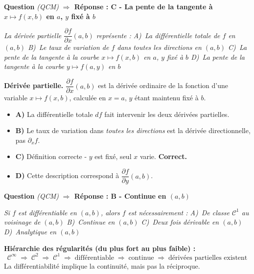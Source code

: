 \documentclass[11pt,a4paper]{article}
\newcounter{qnum}
\newcommand{\qtitre}[2]{%
  \stepcounter{qnum}%
  \medskip\noindent
  \textbf{\color{bleutexte}Question \theqnum}\enspace
  \textit{(#1)}\enspace
  \textcolor{vertok}{\textbf{$\Rightarrow$ Réponse : #2}}
  \par\smallskip
}
\newcommand{\qenonce}[1]{%
  \begin{mdframed}[backgroundcolor=grisbox, linewidth=0pt,
    innerleftmargin=8pt, innerrightmargin=8pt,
    innertopmargin=5pt, innerbottommargin=5pt,
    skipabove=2pt, skipbelow=4pt]
  \small\textit{#1}
  \end{mdframed}
}
\begin{document}
\qtitre{QCM}{C - La pente de la tangente à $x\mapsto f(x,b)$ en $a$, $y$ fixé à $b$}
\qenonce{La dérivée partielle $\dfrac{\partial f}{\partial x}(a,b)$ représente :
\quad A)~La différentielle totale de $f$ en $(a,b)$
\quad B)~Le taux de variation de $f$ dans toutes les directions en $(a,b)$
\quad C)~La pente de la tangente à la courbe $x\mapsto f(x,b)$ en $a$, $y$ fixé à $b$
\quad D)~La pente de la tangente à la courbe $y\mapsto f(a,y)$ en $b$}

\begin{methodebox}
\textbf{Dérivée partielle.} $\dfrac{\partial f}{\partial x}(a,b)$ est la dérivée ordinaire de la fonction d'une variable $x\mapsto f(x,b)$, calculée en $x=a$, $y$ étant maintenu fixé à $b$.
\end{methodebox}

\begin{itemize}[leftmargin=1.5em, itemsep=2pt]
  \item \textcolor{rougeerr}{\textbf{A)}} La différentielle totale $df$ fait intervenir les deux dérivées partielles.
  \item \textcolor{rougeerr}{\textbf{B)}} Le taux de variation dans \emph{toutes les directions} est la dérivée directionnelle, pas $\partial_x f$.
  \item \textcolor{vertok}{\textbf{C)}} Définition correcte - $y$ est fixé, seul $x$ varie. \textbf{Correct.}
  \item \textcolor{rougeerr}{\textbf{D)}} Cette description correspond à $\dfrac{\partial f}{\partial y}(a,b)$.
\end{itemize}

\qtitre{QCM}{B - Continue en $(a,b)$}
\qenonce{Si $f$ est différentiable en $(a,b)$, alors $f$ est nécessairement :
\quad A)~De classe $\mathcal{C}^1$ au voisinage de $(a,b)$
\quad B)~Continue en $(a,b)$
\quad C)~Deux fois dérivable en $(a,b)$
\quad D)~Analytique en $(a,b)$}

\begin{methodebox}
\textbf{Hiérarchie des régularités (du plus fort au plus faible) :}
$$\mathcal{C}^\infty \;\Rightarrow\; \mathcal{C}^2 \;\Rightarrow\; \mathcal{C}^1 \;\Rightarrow\; \text{différentiable} \;\Rightarrow\; \text{continue} \;\Rightarrow\; \text{dérivées partielles existent}$$
La différentiabilité implique la continuité, mais pas la réciproque.
\end{methodebox}
\end{document}
